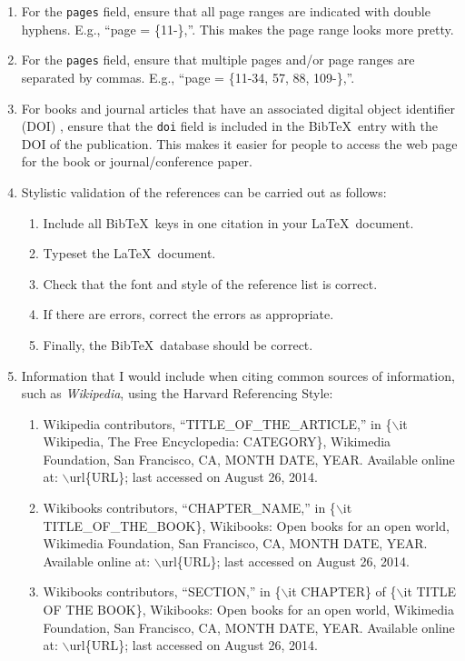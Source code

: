 \documentclass[letter,12pt]{article}
\begin{document}
\begin{enumerate}
\item For the {\tt pages} field, ensure that all page ranges are indicated with double hyphens. E.g., ``page = \{11-\},''. This makes the page range looks more pretty.
\item For the {\tt pages} field, ensure that multiple pages and/or page ranges are separated by commas. E.g., ``page = \{11-34, 57, 88, 109-\},''.
\item For books and journal articles that have an associated digital object identifier (DOI) \cite{InternationalDOIFoundationStaff2017}, ensure that the {\tt doi} field is included in the {\sc Bib}\TeX\ entry with the DOI of the publication. This makes it easier for people to access the web page for the book or journal/conference paper.
\item Stylistic validation of the references can be carried out as follows: \vspace{-0.3cm}
	\begin{enumerate} \itemsep -2pt
	\item Include all {\sc Bib}\TeX\ keys in one citation in your \LaTeX\ document.
	\item Typeset the \LaTeX\ document.
	\item Check that the font and style of the reference list is correct.
	\item If there are errors, correct the errors as appropriate.
	\item Finally, the {\sc Bib}\TeX\ database should be correct.
	\end{enumerate}
\item Information that I would include when citing common sources of information, such as {\it Wikipedia}, using the Harvard Referencing Style: \vspace{-0.3cm}
	\begin{enumerate} \itemsep -2pt
	\item Wikipedia contributors, ``TITLE\_OF\_THE\_ARTICLE,'' in \{$\backslash$it Wikipedia, The Free Encyclopedia: CATEGORY\}, Wikimedia Foundation, San Francisco, CA, MONTH DATE, YEAR. Available online at: $\backslash$url\{URL\}; last accessed on August 26, 2014.
	\item Wikibooks contributors, ``CHAPTER\_NAME,'' in \{$\backslash$it TITLE\_OF\_THE\_BOOK\}, Wikibooks: Open books for an open world, Wikimedia Foundation, San Francisco, CA, MONTH DATE, YEAR. Available online at: $\backslash$url\{URL\}; last accessed on August 26, 2014.
	\item Wikibooks contributors, ``SECTION,'' in \{$\backslash$it CHAPTER\} of \{$\backslash$it TITLE OF THE BOOK\}, Wikibooks: Open books for an open world, Wikimedia Foundation, San Francisco, CA, MONTH DATE, YEAR. Available online at: $\backslash$url\{URL\}; last accessed on August 26, 2014.

\end{enumerate}
\end{enumerate}
\end{document}
